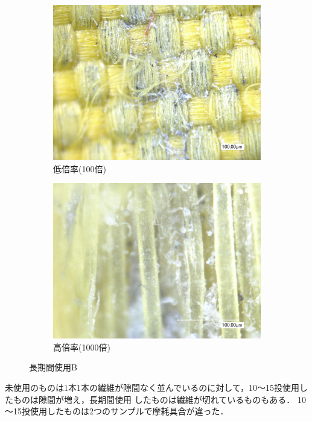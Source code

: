 \documentclass[main]{subfiles}
\begin{document}
\begin{figure}[H]
    \centering
    \begin{subfigure}[htbp]{0.45\linewidth}
        \centering
        \includegraphics[keepaspectratio, width=0.8\linewidth]{figures/縁/カーリングパッド長期低倍率B.jpg}
        \caption{低倍率(100倍)}
        \label{fig:label}
    \end{subfigure}
    \begin{subfigure}[htbp]{0.45\linewidth}
        \centering
        \includegraphics[keepaspectratio, width=0.8\linewidth]{figures/縁/カーリングパッド長期B.jpg}
        \caption{高倍率(1000倍)}
        \label{fig:label}
    \end{subfigure}
    \caption{長期間使用B}
    \label{fig:5}
\end{figure}


未使用のものは1本1本の繊維が隙間なく並んでいるのに対して，10～15投使用したものは隙間が増え，長期間使用
したものは繊維が切れているものもある．
10～15投使用したものは2つのサンプルで摩耗具合が違った．
\end{document}
